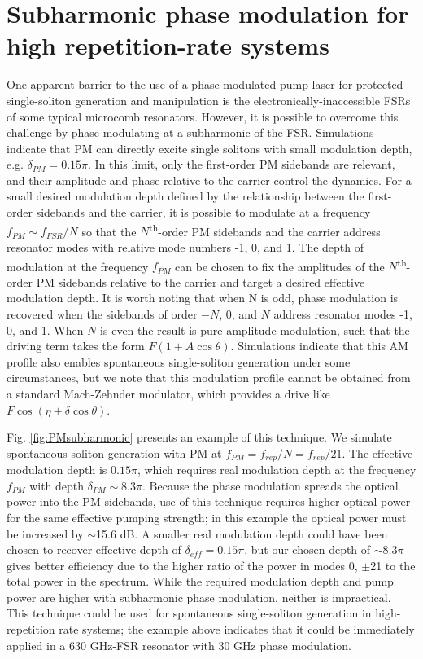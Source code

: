 \section{Subharmonic phase modulation for high repetition-rate systems}

One apparent barrier to the use of a phase-modulated pump laser for protected single-soliton generation and manipulation is the electronically-inaccessible FSRs of some typical microcomb resonators. However, it is possible to overcome this challenge by phase modulating at a subharmonic of the FSR.  Simulations indicate that PM can directly excite single solitons with small modulation depth, e.g. $\delta_{PM}=0.15\pi$. In this limit, only the first-order PM sidebands are relevant, and their amplitude and phase relative to the carrier control the dynamics. For a small desired modulation depth defined by the relationship between the first-order sidebands and the carrier, it is possible to modulate at a frequency $f_{PM}\sim f_{FSR}/N$ so that the $N$\textsuperscript{th}-order PM sidebands and the carrier address resonator modes with relative mode numbers -1, 0, and 1. The depth of modulation at the frequency $f_{PM}$ can be chosen to fix the amplitudes of the $N$\textsuperscript{th}-order PM sidebands relative to the carrier and target a desired effective modulation depth. It is worth noting that when N is odd, phase modulation is recovered when the sidebands of order $-N$, 0, and $N$ address resonator modes -1, 0, and 1. When $N$ is even the result is pure amplitude modulation, such that the driving term takes the form $F(1+A \cos{\theta})$. Simulations indicate that this AM profile also enables spontaneous single-soliton generation under some circumstances, but we note that this modulation profile cannot be obtained from a standard Mach-Zehnder modulator, which provides a drive like $F \cos(\eta+\delta \cos{\theta})$.

Fig. \ref{fig:PMsubharmonic} presents an example of this technique. We simulate spontaneous soliton generation with PM at $f_{PM}=f_{rep}/N=f_{rep}/21$. The effective modulation depth is $0.15\pi$, which requires real modulation depth at the frequency $f_{PM}$ with depth $\delta_{PM}\sim8.3\pi$.  Because the phase modulation spreads the optical power into the PM sidebands, use of this technique requires higher optical power for the same effective pumping strength; in this example the optical power must be increased by $\sim$15.6 dB. A smaller real modulation depth could have been chosen to recover effective depth of $\delta_{eff}=0.15\pi$, but our chosen depth of $\sim8.3\pi$ gives better efficiency due to the higher ratio of the power in modes $0$, $\pm$21 to the total power in the spectrum. While the required modulation depth and pump power are higher with subharmonic phase modulation, neither is impractical. This technique could be used for spontaneous single-soliton generation in high-repetition rate systems; the example above indicates that it could be immediately applied in a 630 GHz-FSR resonator with 30 GHz phase modulation. 

